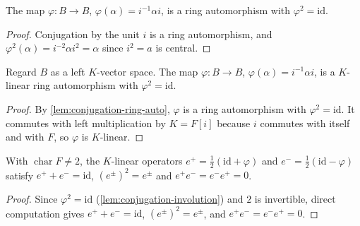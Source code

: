 \begin{lemma}
    \label{lem:conjugation-ring-auto}
    The map $\varphi \colon B \to B$, $\varphi(\alpha) = i^{-1}\alpha i$, is a ring
    automorphism with $\varphi^2 = \mathrm{id}$.
\end{lemma}
\begin{proof}
    Conjugation by the unit $i$ is a ring automorphism, and $\varphi^2(\alpha) =
    i^{-2}\alpha i^2 = \alpha$ since $i^2 = a$ is central.
\end{proof}

\begin{lemma}
    \label{lem:conjugation-involution}
    Regard $B$ as a left $K$-vector space. The map
    $\varphi \colon B \to B$, $\varphi(\alpha) = i^{-1}\alpha i$, is a $K$-linear
    ring automorphism with $\varphi^2 = \mathrm{id}$.
\end{lemma}
\begin{proof}
    By \ref{lem:conjugation-ring-auto}, $\varphi$ is a ring automorphism with
    $\varphi^2 = \mathrm{id}$. It commutes with left multiplication by $K = F[i]$
    because $i$ commutes with itself and with $F$, so $\varphi$ is $K$-linear.
\end{proof}

\begin{lemma}
    \label{lem:conjugation-idempotents}
    With $\operatorname{char} F \neq 2$, the $K$-linear operators $e^{+} =
    \tfrac12(\mathrm{id} + \varphi)$ and $e^{-} = \tfrac12(\mathrm{id} - \varphi)$
    satisfy $e^{+} + e^{-} = \mathrm{id}$, $(e^{\pm})^2 = e^{\pm}$ and
    $e^{+}e^{-} = e^{-}e^{+} = 0$.
\end{lemma}
\begin{proof}
    Since $\varphi^2 = \mathrm{id}$ (\ref{lem:conjugation-involution}) and $2$ is
    invertible, direct computation gives $e^{+} + e^{-} = \mathrm{id}$,
    $(e^{\pm})^2 = e^{\pm}$, and $e^{+}e^{-} = e^{-}e^{+} = 0$.
\end{proof}

